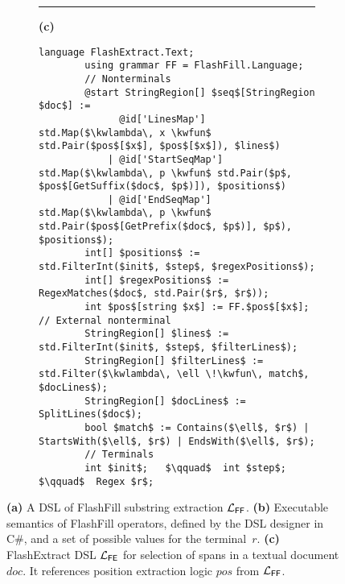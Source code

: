 \begin{figure*}
\begin{subfigure}{\textwidth}
    \end{subfigure}
    \begin{subfigure}{\textwidth}
    \hrule
    \vspace{5pt}
    \hfill\textbf{(c)}
    \vspace{-0.9\baselineskip}
    \begin{lstlisting}[language=dsl,gobble=8,morekeywords={StringRegion,Regex}]
        language FlashExtract.Text;
        using grammar FF = FlashFill.Language;
        // Nonterminals
        @start StringRegion[] $seq$[StringRegion $doc$] :=
              @id['LinesMap'] std.Map($\kwlambda\, x \kwfun$ std.Pair($pos$[$x$], $pos$[$x$]), $lines$)
            | @id['StartSeqMap'] std.Map($\kwlambda\, p \kwfun$ std.Pair($p$, $pos$[GetSuffix($doc$, $p$)]), $positions$)
            | @id['EndSeqMap'] std.Map($\kwlambda\, p \kwfun$ std.Pair($pos$[GetPrefix($doc$, $p$)], $p$), $positions$);
        int[] $positions$ := std.FilterInt($init$, $step$, $regexPositions$);
        int[] $regexPositions$ := RegexMatches($doc$, std.Pair($r$, $r$));
        int $pos$[string $x$] := FF.$pos$[$x$];  // External nonterminal
        StringRegion[] $lines$ := std.FilterInt($init$, $step$, $filterLines$);
        StringRegion[] $filterLines$ := std.Filter($\kwlambda\, \ell \!\kwfun\, match$, $docLines$);
        StringRegion[] $docLines$ := SplitLines($doc$);
        bool $match$ := Contains($\ell$, $r$) | StartsWith($\ell$, $r$) | EndsWith($\ell$, $r$);
        // Terminals
        int $init$;   $\qquad$  int $step$;  $\qquad$  Regex $r$;
    \end{lstlisting}
    \end{subfigure}
    \caption{\textbf{(a)} A DSL of FlashFill substring extraction $\mathcal{L}_{\mathsf{FF}}$.
    \textbf{(b)} Executable semantics of FlashFill operators, defined by the DSL designer in C\#, and
    a set of possible values for the terminal~$r$.
    \textbf{(c)}
    FlashExtract DSL $\mathcal{L}_{\mathsf{FE}}$ for selection of spans in a textual document $doc$.
    It references position extraction logic $pos$ from $\mathcal{L}_{\mathsf{FF}}$. }
    \label{fig:dsl:flashfill}
\end{figure*}
